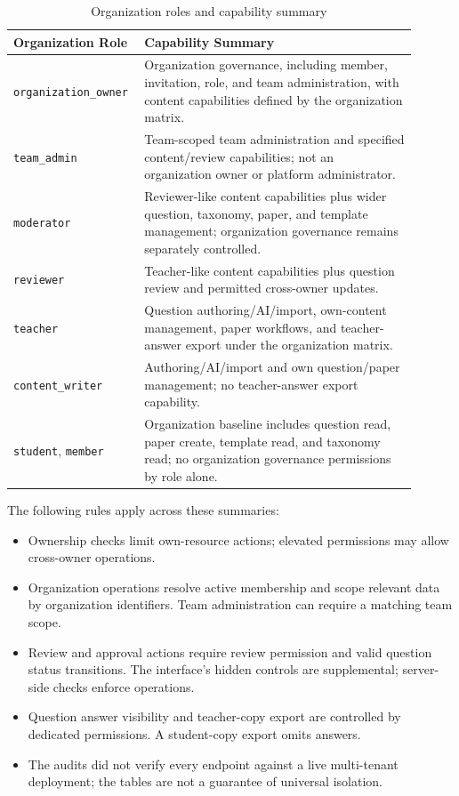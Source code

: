 \begin{table}[H]
    \centering
    \caption{Organization roles and capability summary}
    \label{tab:organization-role-permissions}
    \begin{tabular}{|p{0.25\linewidth}|p{0.65\linewidth}|}
        \hline
        \textbf{Organization Role} & \textbf{Capability Summary} \\
        \hline
        \texttt{organization\_owner} & Organization governance, including member, invitation, role, and team administration, with content capabilities defined by the organization matrix. \\
        \hline
        \texttt{team\_admin} & Team-scoped team administration and specified content/review capabilities; not an organization owner or platform administrator. \\
        \hline
        \texttt{moderator} & Reviewer-like content capabilities plus wider question, taxonomy, paper, and template management; organization governance remains separately controlled. \\
        \hline
        \texttt{reviewer} & Teacher-like content capabilities plus question review and permitted cross-owner updates. \\
        \hline
        \texttt{teacher} & Question authoring/AI/import, own-content management, paper workflows, and teacher-answer export under the organization matrix. \\
        \hline
        \texttt{content\_writer} & Authoring/AI/import and own question/paper management; no teacher-answer export capability. \\
        \hline
        \texttt{student}, \texttt{member} & Organization baseline includes question read, paper create, template read, and taxonomy read; no organization governance permissions by role alone. \\
        \hline
    \end{tabular}
\end{table}

The following rules apply across these summaries:

\begin{itemize}
    \item Ownership checks limit own-resource actions; elevated permissions may allow cross-owner operations.
    \item Organization operations resolve active membership and scope relevant data by organization identifiers. Team administration can require a matching team scope.
    \item Review and approval actions require review permission and valid question status transitions. The interface's hidden controls are supplemental; server-side checks enforce operations.
    \item Question answer visibility and teacher-copy export are controlled by dedicated permissions. A student-copy export omits answers.
    \item The audits did not verify every endpoint against a live multi-tenant deployment; the tables are not a guarantee of universal isolation.
\end{itemize}

